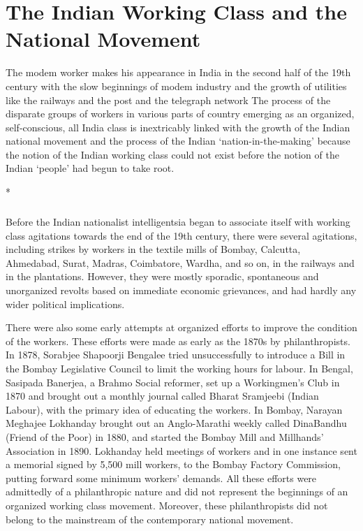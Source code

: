\chapter[The Indian Working Class and National Movement]{The Indian Working Class and the National Movement}

The modem worker makes his appearance in India in the second half of the 19th century with the slow beginnings of modem industry and the growth of utilities like the railways and the post and the telegraph network The process of the disparate groups of workers in various parts of country emerging as an organized, self-conscious, all India class is inextricably linked with the growth of the Indian national movement and the process of the Indian `nation-in-the-making' because the notion of the Indian working class could not exist before the notion of the Indian `people' had begun to take root.

\begin{center}*\end{center}

\paragraph*{}

Before the Indian nationalist intelligentsia began to associate itself with working class agitations towards the end of the 19th century, there were several agitations, including strikes by workers in the textile mills of Bombay, Calcutta, Ahmedabad, Surat, Madras, Coimbatore, Wardha, and so on, in the railways and in the plantations. However, they were mostly sporadic, spontaneous and unorganized revolts based on immediate economic grievances, and had hardly any wider political implications.

There were also some early attempts at organized efforts to improve the condition of the workers. These efforts were made as early as the 1870s by philanthropists. In 1878, Sorabjee Shapoorji Bengalee tried unsuccessfully to introduce a Bill in the Bombay Legislative Council to limit the working hours for labour. In Bengal, Sasipada Banerjea, a Brahmo Social reformer, set up a Workingmen's Club in 1870 and brought out a monthly journal called Bharat Sramjeebi (Indian Labour), with the primary idea of educating the workers. In Bombay, Narayan Meghajee Lokhanday brought out an Anglo-Marathi weekly called DinaBandhu (Friend of the Poor) in 1880, and started the Bombay Mill and Millhands' Association in 1890. Lokhanday held meetings of workers and in one instance sent a memorial signed by 5,500 mill workers, to the Bombay Factory Commission, putting forward some minimum workers' demands. All these efforts were admittedly of a philanthropic nature and did not represent the beginnings of an organized working class movement. Moreover, these philanthropists did not belong to the mainstream of the contemporary national movement.

